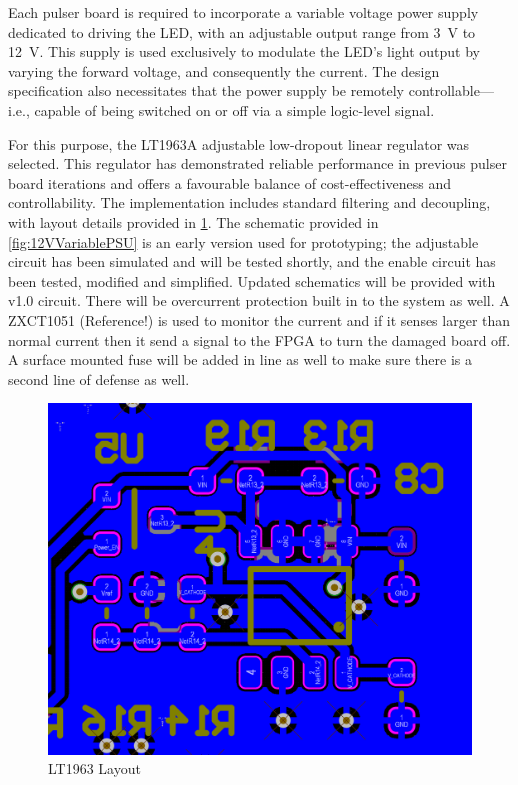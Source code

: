\documentclass[a4paper,11pt]{article}
\begin{document}
Each pulser board is required to incorporate a variable voltage power supply dedicated to driving the LED, with an adjustable output range from 3~V to 12~V. This supply is used exclusively to modulate the LED’s light output by varying the forward voltage, and consequently the current. The design specification also necessitates that the power supply be remotely controllable—i.e., capable of being switched on or off via a simple logic-level signal.

For this purpose, the LT1963A \cite{LT1963} adjustable low-dropout linear regulator was selected. This regulator has demonstrated reliable performance in previous pulser board iterations and offers a favourable balance of cost-effectiveness and controllability. The implementation includes standard filtering and decoupling, with layout details provided in \cref{fig:LT1963Layout}. The schematic provided in \cref{fig:12VVariablePSU} is an early version used for prototyping; the adjustable circuit has been simulated and will be tested shortly, and the enable circuit has been tested, modified and simplified. Updated schematics will be provided with v1.0 circuit. There will be overcurrent protection built in to the system as well. A ZXCT1051 (Reference!) is used to monitor the current and if it senses larger than normal current then it send a signal to the FPGA to turn the damaged board off. A surface mounted fuse will be added in line as well to make sure there is a second line of defense as well.

\begin{figure}[h!]
\centering
\includegraphics[scale=0.5]{LT1963layout.png}
\caption{LT1963 Layout\label{fig:LT1963Layout}}
\end{figure}
\end{document}
